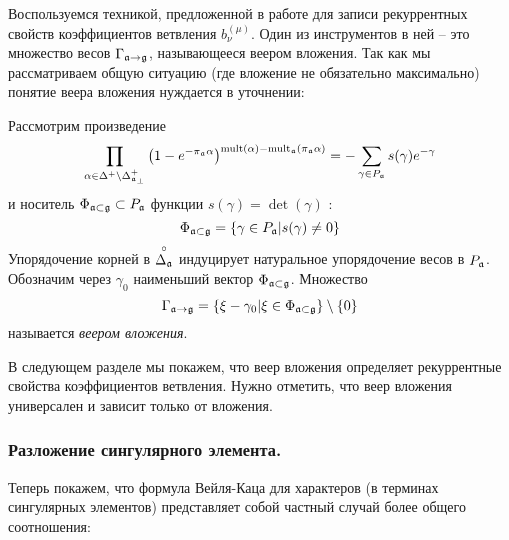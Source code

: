 Воспользуемся техникой, предложенной в работе  \cite{ilyin812pbc} для записи рекуррентных свойств коэффициентов ветвления $b_{\nu}^{(\mu )}$. Один из инструментов в ней -- это множество весов $\Gamma_{\mathfrak{a}\rightarrow \mathfrak{g}}$, называющееся веером вложения. Так как мы рассматриваем общую ситуацию (где вложение не обязательно максимально) понятие веера вложения нуждается в уточнении:
\begin{definition}
\label{fan-definition} Рассмотрим произведение
\begin{equation}
\prod_{\alpha \in \Delta ^{+}\setminus \Delta _{\afb }^{+}}\left( 1-e^{-\pi
_{\af}\alpha }\right) ^{\mathrm{mult}(\alpha )-\mathrm{mult}_{\af%
}(\pi _{\af}\alpha )}=-\sum_{\gamma \in P_{\af}}s(\gamma
)e^{-\gamma }  \label{eq:142}
\end{equation}
и носитель $\Phi _{\mathfrak{a}\subset \mathfrak{g}}\subset P_{\mathfrak{a}}$ функции $s(\gamma )=\det \left( \gamma \right) $ :
\begin{equation}
\Phi _{\mathfrak{a}\subset \mathfrak{g}}=\left\{ \gamma \in P_{\mathfrak{a}}|s(\gamma
)\neq 0\right\}   \label{eq:37}
\end{equation}
Упорядочение корней в  $\stackrel{\circ }{\Delta _{\mathfrak{a}}}$ индуцирует натуральное упорядочение весов в $P_{\mathfrak{a}}$. Обозначим через $\gamma_{0}$ наименьший вектор $\Phi _{\mathfrak{a}\subset \mathfrak{g}}$. Множество
\begin{equation}
\Gamma _{\af\rightarrow \gf}=\left\{ \xi -\gamma _{0}|\xi \in \Phi _{%
\af\subset \gf}\right\} \setminus \left\{ 0\right\}
\label{fan-defined}
\end{equation}
называется  \textit{веером вложения}.
\end{definition}
В следующем разделе мы покажем, что веер вложения определяет рекуррентные свойства коэффициентов ветвления. Нужно отметить, что веер вложения универсален и зависит только от вложения. 

\subsubsection{Разложение сингулярного элемента.}
\label{subsec:decomp-sing-element}

Теперь покажем, что формула Вейля-Каца для характеров (в терминах сингулярных элементов) представляет собой частный случай более общего соотношения:

